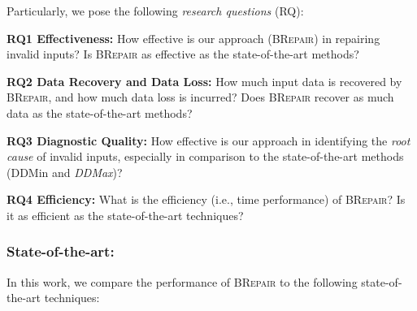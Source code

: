 \documentclass[sigconf,review,anonymous]{acmart}
\newcommand{\recheck}[1]{\textcolor{red}{#1}}
\newcommand{\revise}[1]{\textcolor{blue}{#1}}
\newcommand{\ddmin}{\textit{ddmin}\xspace}
\newcommand{\approach}{\textsc{BRepair}\xspace}
\def\ddmin{DDMin\xspace}
\newcommand{\ddmax}{\textit{DDMax}\xspace}
\begin{document}
Particularly,
we pose the following \textit{research questions} (RQ):

\noindent
\textbf{RQ1 Effectiveness:}  %
How effective is our approach (\approach) in repairing invalid %
inputs? %
Is \approach %
as effective as %
the state-of-the-art methods? 

\noindent
\textbf{RQ2 Data Recovery and Data Loss:}
How much input data is recovered by \approach, and how much data loss is incurred?  Does \approach recover as much data as %
the state-of-the-art methods?


\noindent
\textbf{RQ3 Diagnostic Quality:}
How effective is our approach in identifying the \textit{root cause} of invalid inputs, especially in comparison to the state-of-the-art methods (\ddmin and \ddmax)?
%

\noindent
\textbf{RQ4 Efficiency:} %
What is the efficiency (i.e., time performance) of
\approach? Is it as efficient as %
the state-of-the-art %
techniques?


\subsubsection*{\bf State-of-the-art:}
In this work, we compare the performance of \approach to the following state-of-the-art techniques: %
\end{document}
